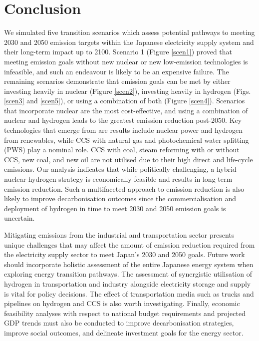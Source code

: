 \section{Conclusion} \label{Conclusion}

We simulated five transition scenarios which assess potential pathways to meeting 2030 and 2050 emission targets within the Japanese electricity supply system and their long-term impact up to 2100. Scenario 1 (Figure \ref{scen1}) proved that meeting emission goals without new nuclear or new low-emission technologies is infeasible, and such an endeavour is likely to be an expensive failure. The remaining scenarios demonstrate that emission goals can be met by either investing heavily in nuclear (Figure \ref{scen2}), investing heavily in hydrogen (Figs. \ref{scen3} and \ref{scen5}), or using a combination of both (Figure \ref{scen4}). Scenarios that incorporate nuclear are the most cost-effective, and using a combination of nuclear and hydrogen leads to the greatest emission reduction post-2050. Key technologies that emerge from are results include nuclear power and hydrogen from renewables, while \gls{CCS} with natural gas and photochemical water splitting (\gls{PWS}) play a nominal role. CCS with coal, steam reforming with or without CCS, new coal, and new oil are not utilised due to their high direct and life-cycle emissions. Our analysis indicates that while politically challenging, a hybrid nuclear-hydrogen strategy is economically feasible and results in long-term emission reduction. Such a multifaceted approach to emission reduction is also likely to improve decarbonisation outcomes since the commercialisation and deployment of hydrogen in time to meet 2030 and 2050 emission goals is uncertain.

Mitigating emissions from the industrial and transportation sector presents unique challenges that may affect the amount of emission reduction required from the electricity supply sector to meet Japan's 2030 and 2050 goals. Future work should incorporate holistic assessment of the entire Japanese energy system when exploring energy transition pathways. The assessment of synergistic utilisation of hydrogen in transportation and industry alongside electricity storage and supply is vital for policy decisions. The effect of transportation media such as trucks and pipelines on hydrogen and CCS is also worth investigating. Finally, economic feasibility analyses with respect to national budget requirements and projected GDP trends must also be conducted to improve decarbonisation strategies, improve social outcomes, and delineate investment goals for the energy sector.

